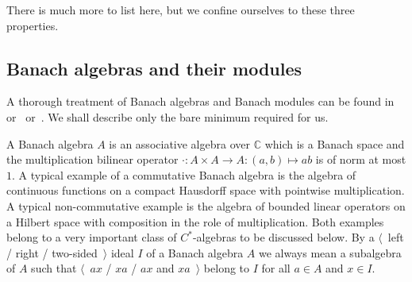 There is much more to list here, but we confine ourselves to these three
properties.


\subsection{
  Banach algebras and their modules}\label{SubSectionBanachAlgebrasAndTheirModules}

A thorough treatment of Banach algebras and Banach modules can be found
in~\cite{HelBanLocConvAlg} or~\cite{HelHomolBanTopAlg}
or~\cite{DalBanAlgAutCont}. We shall describe only the bare minimum required for
us.

A Banach algebra $A$ is an associative algebra over $\mathbb{C}$ which is a
Banach space and the multiplication bilinear operator 
$\cdot:A\times A\to A:(a,b)\mapsto ab$ is of norm at most $1$. A typical
example of a commutative Banach algebra is the algebra of continuous functions on
a compact Hausdorff space with pointwise multiplication. A typical non-commutative 
example is the algebra of bounded linear operators on a Hilbert
space with composition in the role of multiplication. Both examples belong to a
very important class of $C^*$-algebras to be discussed below. By a $\langle$~left
/ right / two-sided~$\rangle$ ideal $I$ of a Banach algebra $A$ we always mean 
a subalgebra of $A$ such that $\langle$~$ax$ / $xa$ / $ax$ and
$xa$~$\rangle$ belong to $I$ for all $a\in A$ and $x\in I$.

